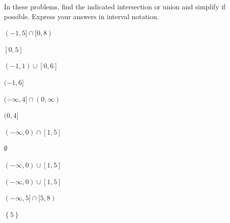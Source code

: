 \documentclass{ximera}
\begin{document}
\begin{question}
In these problems, find the indicated intersection or union and simplify if possible.  Express your answers in interval notation.    

\begin{problem}

$(-1,5] \cap [0,8)$ 

\begin{solution}
    $[0,5]$
\end{solution}
\end{problem}

\begin{problem}
$(-1,1) \cup [0,6]$

\begin{solution}
    $(-1,6]$
\end{solution}
\end{problem}

\begin{problem}
$(-\infty,4]\cap (0,\infty)$

\begin{solution}
    $(0,4]$
\end{solution}
\end{problem}

\begin{problem}
$(-\infty,0) \cap [1,5]$

\begin{solution}
    $\emptyset$
\end{solution}
\end{problem}

\begin{problem}
$(-\infty, 0) \cup [1,5]$

\begin{solution}
    $(-\infty,0) \cup [1,5]$
\end{solution}
\end{problem}

\begin{problem}\label{findunionintlast}
$(-\infty, 5] \cap [5,8)$ 

\begin{solution}
     $\left\{ 5\right\}$
\end{solution}
\end{problem}

\end{question}
\end{document}
